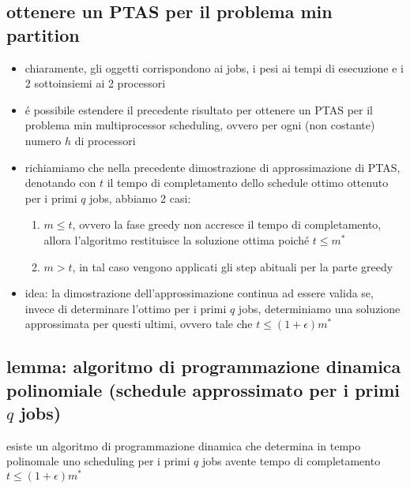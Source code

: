 
\subsection*{ottenere un PTAS per il problema min partition}
\begin{flushleft}
	\begin{itemize}
		\item chiaramente, gli oggetti corrispondono ai jobs, i pesi ai tempi di esecuzione e i 2 sottoinsiemi ai 2 processori
		\item \'e possibile estendere il precedente risultato per ottenere un PTAS per il problema min multiprocessor scheduling, ovvero per ogni (non costante) numero $h$ di processori
		\item richiamiamo che nella precedente dimostrazione di approssimazione di PTAS, denotando con $t$ il tempo di completamento dello schedule ottimo ottenuto per i primi $q$ jobs, abbiamo 2 casi:
		\begin{enumerate}
			\item $m\leq t$, ovvero la fase greedy non accresce il tempo di completamento, allora l'algoritmo restituisce la soluzione ottima poich\'e $t\leq m^*$
			\item $m>t$, in tal caso vengono applicati gli step abituali per la parte greedy
		\end{enumerate}
		\item idea: la dimostrazione dell'approssimazione continua ad essere valida se, invece di determinare l'ottimo per i primi $q$ jobs, determiniamo una soluzione approssimata per questi ultimi, ovvero tale che $t\leq(1+\epsilon)m^*$
	\end{itemize}
\end{flushleft}


\subsection*{lemma: algoritmo di programmazione dinamica polinomiale (schedule approssimato per i primi $q$ jobs)}
\begin{flushleft}
	esiste un algoritmo di programmazione dinamica che determina in tempo polinomale uno scheduling per i primi $q$ jobs avente tempo di completamento $t\leq(1+\epsilon)m^*$ \newline \\
\end{flushleft}

